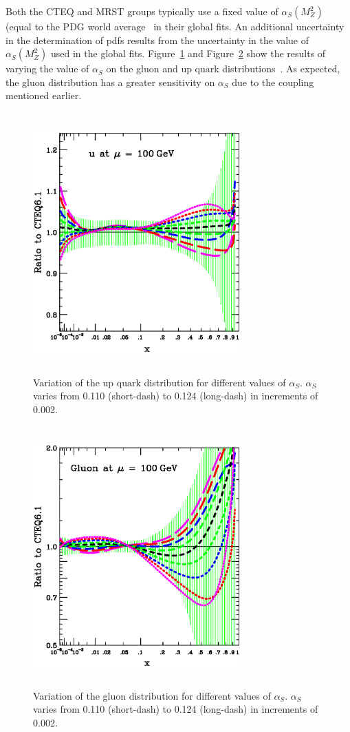 \documentclass[12pt]{iopart}
\def\as{\alpha_S}
\begin{document}
Both the  CTEQ and MRST groups typically use a fixed value of $\as(M_Z^2)$ (equal to the PDG world
average~\cite{Eidelman:2004wy} in their global fits. An additional uncertainty in the determination of pdfs results from the
uncertainty in the value of $\as(M_Z^2)$ used in the global fits. Figure~\ref{fig:up_alphas}  and
Figure~\ref{fig:gluon_alphas}  show the results of varying the value of $\as$ on the gluon and up quark
distributions~\cite{Pumplin:2005rh}. As expected, the gluon distribution has a greater sensitivity on $\as$ due  to the
coupling mentioned earlier. 
%
\begin{figure}[t]
\begin{center}
\includegraphics[width=8cm,height=10cm]{figquark13e.eps}
\end{center}
\caption{
Variation of the up quark distribution for different values of $\as$. $\as$ varies from
0.110 (short-dash) to 0.124 (long-dash) in increments of 0.002.  
\label{fig:up_alphas}
}
\end{figure}
%
%
\begin{figure}[t]
\begin{center}
\includegraphics[width=8cm,height=10cm]{figquark13d.eps}
\end{center}
\caption{
Variation of the gluon distribution for different values of $\as$.
$\as$ varies from 0.110 (short-dash) to 0.124 (long-dash) in increments of 0.002.
\label{fig:gluon_alphas}
}
\end{figure}
\end{document}

